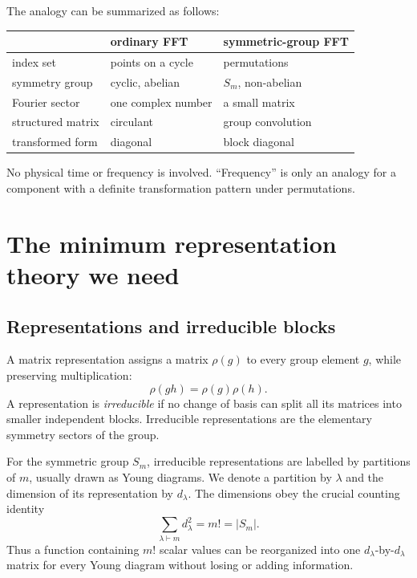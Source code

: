 \documentclass[11pt,a4paper]{article}
\begin{document}
The analogy can be summarized as follows:
\begin{center}
\begin{tabular}{lll}
  \toprule
   & ordinary FFT & symmetric-group FFT \\
  \midrule
  index set & points on a cycle & permutations \\
  symmetry group & cyclic, abelian & $S_m$, non-abelian \\
  Fourier sector & one complex number & a small matrix \\
  structured matrix & circulant & group convolution \\
  transformed form & diagonal & block diagonal \\
  \bottomrule
\end{tabular}
\end{center}

No physical time or frequency is involved.  ``Frequency'' is only an analogy
for a component with a definite transformation pattern under permutations.

\section{The minimum representation theory we need}

\subsection{Representations and irreducible blocks}

A matrix representation assigns a matrix $\rho(g)$ to every group element
$g$, while preserving multiplication:
\begin{equation}
  \rho(gh)=\rho(g)\rho(h).
  \label{eq:representation}
\end{equation}
A representation is \emph{irreducible} if no change of basis can split all
its matrices into smaller independent blocks.  Irreducible representations
are the elementary symmetry sectors of the group.

For the symmetric group $S_m$, irreducible representations are labelled by
partitions of $m$, usually drawn as Young diagrams.  We denote a partition
by $\lambda$ and the dimension of its representation by $d_\lambda$.
The dimensions obey the crucial counting identity
\begin{equation}
  \sum_{\lambda\vdash m} d_\lambda^2=m!=|S_m|.
  \label{eq:sum-of-squares}
\end{equation}
Thus a function containing $m!$ scalar values can be reorganized into one
$d_\lambda$-by-$d_\lambda$ matrix for every Young diagram without losing
or adding information.
\end{document}
